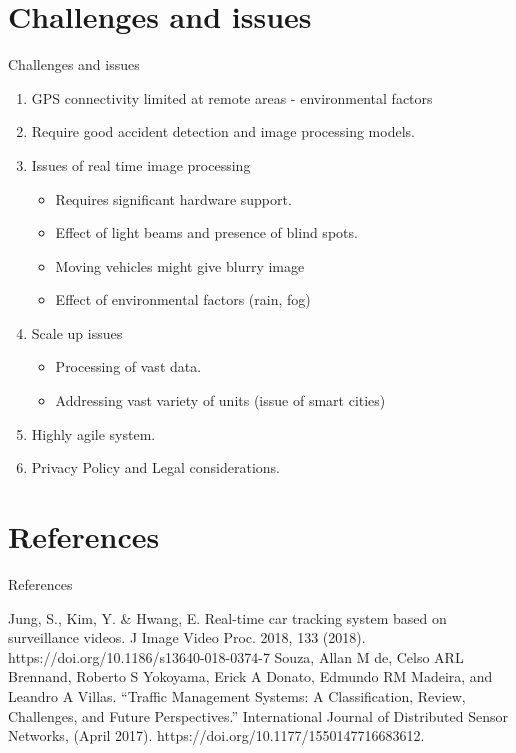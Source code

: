\documentclass{beamer}
\begin{document}
\section{Challenges and issues}
\begin{frame}{Challenges and issues}
	\begin{enumerate}
	    \item GPS connectivity limited at remote areas - environmental factors
		\item Require good accident detection and image processing models.
		\item Issues of real time image processing
		\begin{itemize}
		    \item Requires significant hardware support.	
		    \item Effect of light beams and presence of blind spots.
			\item Moving vehicles might give blurry image
			\item Effect of environmental factors (rain, fog)
		\end{itemize}
		\item Scale up issues
		\begin{itemize}
			\item Processing of vast data.
			\item Addressing vast variety of units (issue of smart cities)
		\end{itemize}
		\item Highly agile system.
		\item Privacy Policy and Legal considerations.
	\end{enumerate}
\end{frame}

\section{References}
\begin{frame}{References}
\begin{thebibliography}{9}
    \bibitem{} Jung, S., Kim, Y. \& Hwang, E. Real-time car tracking system based on surveillance videos. J Image Video Proc. 2018, 133 (2018). https://doi.org/10.1186/s13640-018-0374-7
    \bibitem{} Souza, Allan M de, Celso ARL Brennand, Roberto S Yokoyama, Erick A Donato, Edmundo RM Madeira, and Leandro A Villas. “Traffic Management Systems: A Classification, Review, Challenges, and Future Perspectives.” International Journal of Distributed Sensor Networks, (April 2017). https://doi.org/10.1177/1550147716683612.

\end{thebibliography}



\end{frame}
\end{document}
